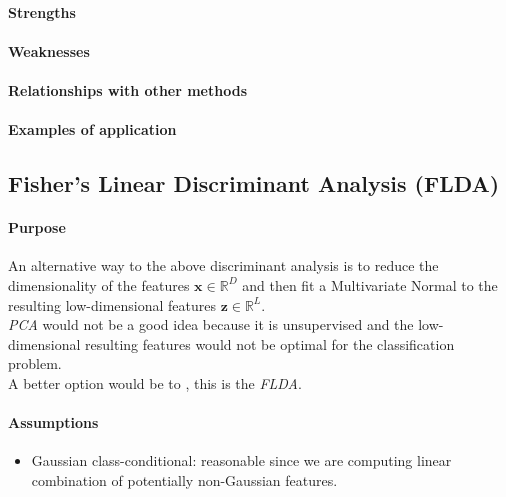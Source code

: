 \paragraph{Strengths}
\paragraph{Weaknesses}
\paragraph{Relationships with other methods}
\paragraph{Examples of application}

\subsection{Fisher's Linear Discriminant Analysis (FLDA)}
\paragraph{Purpose}
An alternative way to the above discriminant analysis is to reduce the dimensionality
of the features $\bm{x}\in\mathbb{R}^{D}$ and then fit a Multivariate Normal to the 
resulting low-dimensional features $\bm{z}\in \mathbb{R}^{L}$.\\
\emph{PCA} would not be a good idea because it is unsupervised and the low-dimensional
resulting features would not be optimal for the classification problem.\\
A better option would be to , this is the \emph{FLDA}.
\paragraph{Assumptions}
\begin{itemize}
    \item Gaussian class-conditional: reasonable since we are computing linear 
        combination of potentially non-Gaussian features.
\end{itemize}


